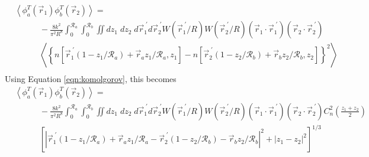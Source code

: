 \begin{equation}\label{eqn:tphase_n2}
\begin{aligned}
&\left\langle \phi^{T}_{a}\left(\vec{r}_{1}\right) \phi^{T}_{b}\left(\vec{r}_{2}\right)\right\rangle = \\
&\quad\quad\quad
-\frac{8k^{2}}{\pi^{2}R^{8}} \int_{0}^{\mathcal{R}_{a}}  \int_{0}^{\mathcal{R}_{b}} \iint dz_{1} \; dz_{2} \; d\vec{r}^{\;\prime}_{1}d\vec{r}^{\;\prime}_{2} W(\vec{r}^{\;\prime}_{1}/R) W(\vec{r}^{\;\prime}_{2}/R)
\left(\vec{r}_{1} \cdot \vec{r}^{\;\prime}_{1}\right)
\left(\vec{r}_{2} \cdot \vec{r}^{\;\prime}_{2}\right)
\\
&\quad\quad\quad
\left\langle \left\{ n\left[\vec{r}^{\;\prime}_{1}\left(1-z_{1}/\mathcal{R}_{a}\right) + \vec{r}_{a} z_{1}/\mathcal{R}_{a}, z_{1}\right] - 
 n\left[\vec{r}^{\;\prime}_{2}\left(1-z_{2}/\mathcal{R}_{b}\right) + \vec{r}_{b} z_{2}/\mathcal{R}_{b}, z_{2}\right]\right\}^{2} \right\rangle \\
\end{aligned}
\end{equation}
Using Equation \ref{eqn:komolgorov}, this becomes
\begin{equation}\label{eqn:tphase_n3}
\begin{aligned}
&\left\langle \phi^{T}_{a}\left(\vec{r}_{1}\right) \phi^{T}_{b}\left(\vec{r}_{2}\right)\right\rangle = \\
&\quad\quad\quad
-\frac{8k^{2}}{\pi^{2}R^{8}} \int_{0}^{\mathcal{R}_{a}}  \int_{0}^{\mathcal{R}_{b}} \iint dz_{1} \; dz_{2} \; d\vec{r}^{\;\prime}_{1}d\vec{r}^{\;\prime}_{2} W(\vec{r}^{\;\prime}_{1}/R) W(\vec{r}^{\;\prime}_{2}/R)
\left(\vec{r}_{1} \cdot \vec{r}^{\;\prime}_{1}\right)
\left(\vec{r}_{2} \cdot \vec{r}^{\;\prime}_{2}\right)
C_{n}^{2}\left(\frac{z_{1} + z_{2}}{2}\right) 
\\
&\quad\quad\quad
\left[ \left\vert \vec{r}^{\;\prime}_{1}\left(1-z_{1}/\mathcal{R}_{a}\right) + \vec{r}_{a} z_{1}/\mathcal{R}_{a} - 
 \vec{r}^{\;\prime}_{2}\left(1-z_{2}/\mathcal{R}_{b}\right) - \vec{r}_{b} z_{2}/\mathcal{R}_{b}\right\vert^{2} + 
\left\vert z_{1} - z_{2} \right\vert^{2} \right]^{1/3}
\end{aligned}
\end{equation}

